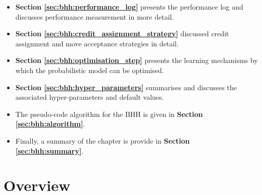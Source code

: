 \begin{itemize}
      \item \textbf{Section \ref{sec:bhh:performance_log}} presents the performance log and discusses performance measurement in more detail.

      \item \textbf{Section \ref{sec:bhh:credit_assignment_strategy}} discussed credit assignment and move acceptance strategies in detail.

      \item \textbf{Section \ref{sec:bhh:optimisation_step}} presents the learning mechanisms by which the probabilistic model can be optimised.

      \item \textbf{Section \ref{sec:bhh:hyper_parameters}} summarises and discusses the associated hyper-parameters and default values.

      \item The pseudo-code algorithm for the \ac{BHH} is given in \textbf{Section \ref{sec:bhh:algorithm}}.

      \item Finally, a summary of the chapter is provide in \textbf{Section \ref{sec:bhh:summary}}.
\end{itemize}


\section{Overview}
\label{sec:bhh:overview}

